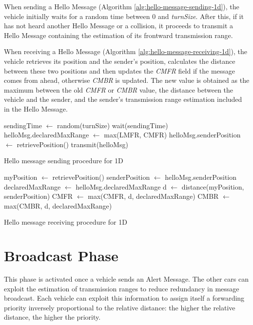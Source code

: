 		When sending a Hello Message (Algorithm \ref{alg:hello-message-sending-1d}), the vehicle initially waits for a random time between 0 and \textit{turnSize}. After this, if it has not heard another Hello Message or a collision, it proceeds to transmit a Hello Message containing the estimation of its frontward transmission range.
		
		
		When receiving a Hello Message (Algorithm \ref{alg:hello-message-receiving-1d}), the vehicle retrieves its position and the sender's position, calculates the distance between these two positions and then updates the \textit{CMFR} field if the message comes from ahead, otherwise \textit{CMBR} is updated. The new value is obtained as the maximum between the old \textit{CMFR} or \textit{CMBR} value, the distance between the vehicle and the sender, and the sender's transmission range estimation included in the Hello Message.
		
		\begin{algorithm}[H]
			\begin{algorithmic}[1]
					\State sendingTime $\gets$ random(turnSize)
					\State wait(sendingTime)
						\State helloMsg.declaredMaxRange $\gets$ max(LMFR, CMFR)
						\State helloMsg.senderPosition $\gets$ retrievePosition()
						\State transmit(helloMsg)
					\EndIf
				\EndFor
			\end{algorithmic}
			\caption{Hello message sending procedure for 1D}
			\label{alg:hello-message-sending-1d}
		\end{algorithm}
		
		\begin{algorithm}[H]
			\begin{algorithmic}[1]
				\State myPosition $\gets$ retrievePosition()
				\State senderPosition $\gets$ helloMsg.senderPosition
				\State declaredMaxRange $\gets$ helloMsg.declaredMaxRange
				\State d $\gets$ distance(myPosition, senderPosition)
				\State CMFR $\gets$ max(CMFR, d, declaredMaxRange)
				\Else
				\State CMBR $\gets$ max(CMBR, d, declaredMaxRange)
				\EndIf
			\end{algorithmic}
			\caption{Hello message receiving procedure for 1D}
			\label{alg:hello-message-receiving-1d}
		\end{algorithm}
	
	\section{Broadcast Phase}
		This phase is activated once a vehicle sends an Alert Message. The other cars can exploit the estimation of transmission ranges to reduce redundancy in message broadcast. Each vehicle can exploit this information to assign itself a forwarding priority inversely proportional to the relative distance: the higher the relative distance, the higher the priority.  
		

